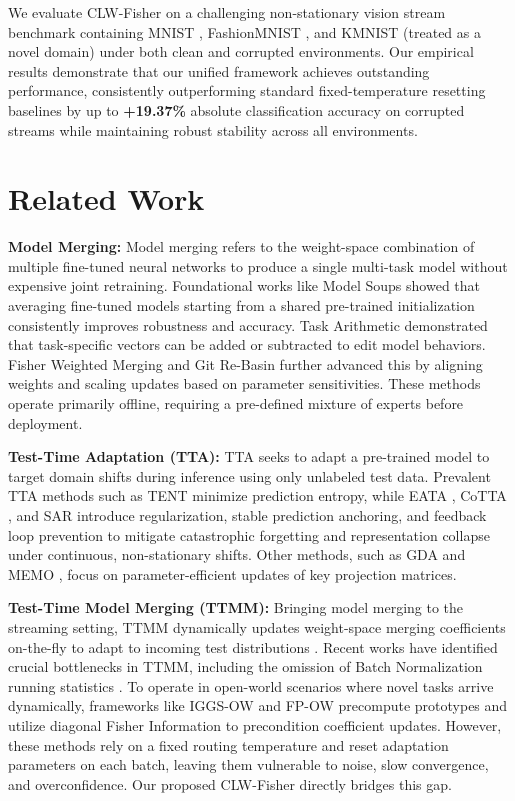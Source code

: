 \documentclass{article}
\theoremstyle{plain}
\theoremstyle{definition}
\theoremstyle{remark}
\begin{document}
We evaluate CLW-Fisher on a challenging non-stationary vision stream benchmark containing MNIST \cite{lecun1998gradient}, FashionMNIST \cite{xiao2017fashion}, and KMNIST \cite{clanuwat2018deep} (treated as a novel domain) under both clean and corrupted environments. Our empirical results demonstrate that our unified framework achieves outstanding performance, consistently outperforming standard fixed-temperature resetting baselines by up to \textbf{+19.37\%} absolute classification accuracy on corrupted streams while maintaining robust stability across all environments.

\section{Related Work}
\label{sec:related}

\textbf{Model Merging:} Model merging refers to the weight-space combination of multiple fine-tuned neural networks to produce a single multi-task model without expensive joint retraining. Foundational works like Model Soups \cite{wortsman2022soups} showed that averaging fine-tuned models starting from a shared pre-trained initialization consistently improves robustness and accuracy. Task Arithmetic \cite{ilharco2023editing} demonstrated that task-specific vectors can be added or subtracted to edit model behaviors. Fisher Weighted Merging \cite{matena2022merging} and Git Re-Basin \cite{ainsworth2023git} further advanced this by aligning weights and scaling updates based on parameter sensitivities. These methods operate primarily offline, requiring a pre-defined mixture of experts before deployment.

\textbf{Test-Time Adaptation (TTA):} TTA seeks to adapt a pre-trained model to target domain shifts during inference using only unlabeled test data. Prevalent TTA methods such as TENT \cite{wang2021tent} minimize prediction entropy, while EATA \cite{niu2022eata}, CoTTA \cite{wang2022cotta}, and SAR \cite{niu2023towards} introduce regularization, stable prediction anchoring, and feedback loop prevention to mitigate catastrophic forgetting and representation collapse under continuous, non-stationary shifts. Other methods, such as GDA \cite{tsai2024gda} and MEMO \cite{yuan2023robust}, focus on parameter-efficient updates of key projection matrices.

\textbf{Test-Time Model Merging (TTMM):} Bringing model merging to the streaming setting, TTMM dynamically updates weight-space merging coefficients on-the-fly to adapt to incoming test distributions \cite{yang2024test, hubotter2025fisher}. Recent works have identified crucial bottlenecks in TTMM, including the omission of Batch Normalization running statistics \cite{anonymous2026drfisher}. To operate in open-world scenarios where novel tasks arrive dynamically, frameworks like IGGS-OW \cite{anonymous2026iggsow} and FP-OW \cite{anonymous2026fpow} precompute prototypes and utilize diagonal Fisher Information to precondition coefficient updates. However, these methods rely on a fixed routing temperature and reset adaptation parameters on each batch, leaving them vulnerable to noise, slow convergence, and overconfidence. Our proposed CLW-Fisher directly bridges this gap.
\end{document}
